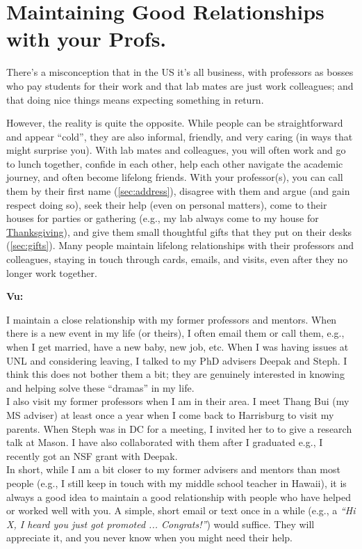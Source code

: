 \documentclass[oneside,11pt,dvipsnames]{book}
\newenvironment{commentbox}[1][]{
  \small
  \begin{mybox}
    {\small \textbf{#1}}
  }{
  \end{mybox}
}
\begin{document}
\section{Maintaining Good Relationships with your Profs.}
There's a misconception that in the US it's all business, with professors as bosses who pay students for their work and that lab mates are just work colleagues; and that doing nice things means expecting something in return.

However, the reality is quite the opposite. While people can be straightforward and appear ``cold'', they are also informal, friendly, and very caring (in ways that might surprise you).
With lab mates and colleagues, you will often work and go to lunch together, confide in each other, help each other navigate the academic journey, and often become lifelong friends.
With your professor(s), you can call them by their first name (\autoref{sec:address}), disagree with them and argue (and gain respect doing so), seek their help (even on personal matters), come to their houses for parties or gathering (e.g., my lab always come to my house for \href{https://photos.app.goo.gl/LFtbqQUuznq9eiL7A}{Thanksgiving}), and give them small thoughtful gifts that they put on their desks (\autoref{sec:gifts}).  
Many people maintain lifelong relationships with their professors and colleagues, staying in touch through cards, emails, and visits, even after they no longer work together.

\begin{commentbox}[Vu:]
    I maintain a close relationship with my former professors and mentors. When there is a new event in my life (or theirs), I often email them or call them, e.g., when I get married, have a new baby, new job, etc. When I was having issues at UNL and considering leaving, I talked to my PhD advisers Deepak and Steph. I think this does not bother them a bit; they are genuinely interested in knowing and helping solve these ``dramas'' in my life.
    \\
    
    I also visit my former professors when I am in their area. I meet Thang Bui (my MS adviser) at least once a year when I come back to Harrisburg to visit my parents. When Steph was in DC for a meeting, I invited her to to give a research talk at Mason. I have also collaborated with them after I graduated e.g., I recently got an NSF grant with Deepak.
    \\
    
    In short, while I am a bit closer to my former advisers and mentors than most people (e.g., I still keep in touch with my middle school teacher in Hawaii), it is always a good idea to maintain a good relationship with people who have helped or worked well with you. A simple, short email or text once in a while (e.g., a \emph{``Hi X, I heard you just got promoted ... Congrats!''}) would suffice. They will appreciate it, and you never know when you might need their help.
    
        
  \end{commentbox}
  
\end{document}
